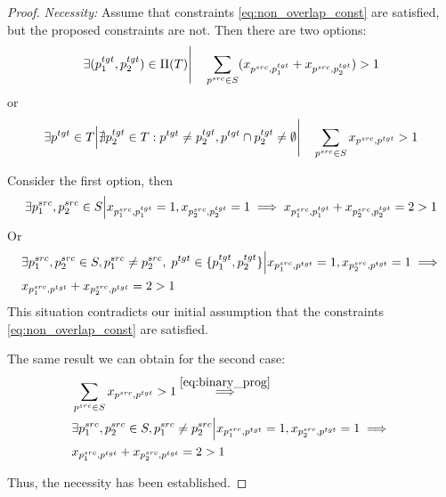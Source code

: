 \begin{proof}
  \textit{Necessity:} Assume that constraints \eqref{eq:non_overlap_const} are satisfied, but
  the proposed constraints are not. Then there are two options:
  \[
    \exists (p_1^{tgt}, p_2^{tgt}) \in \Pi(T) \Bigg| \quad
    \sum\limits_{p^{src} \in S} (x_{p^{src}, p_1^{tgt}} + x_{p^{src}, p_2^{tgt}}) > 1
  \]
  or
  \[
    \exists p^{tgt} \in T \Big|
    \nexists p_2^{tgt} \in T: p^{tgt} \neq p_2^{tgt}, p^{tgt} \cap p_2^{tgt} \neq \emptyset
    \Bigg| \quad \sum\limits_{p^{src} \in S} x_{p^{src}, p^{tgt}} > 1
  \]

  Consider the first option, then
  \begin{align*}
    \exists p_1^{src}, p_2^{src} \in S \Big| x_{p_1^{src}, p_1^{tgt}} = 1, x_{p_2^{src}, p_2^{tgt}} = 1 \implies
    x_{p_1^{src}, p_1^{tgt}} + x_{p_2^{src}, p_2^{tgt}} = 2 > 1 \\
  \end{align*}
  Or
  \begin{align*}
    & \exists p_1^{src}, p_2^{src} \in S, p_1^{src} \neq p_2^{src}, \; p^{tgt} \in \{p_1^{tgt}, p_2^{tgt}  \} \Big| x_{p_1^{src}, p^{tgt}} = 1, x_{p_2^{src}, p^{tgt}} = 1 \implies \\
    & x_{p_1^{src}, p^{tgt}} + x_{p_2^{src}, p^{tgt}} = 2 > 1
  \end{align*}
  This situation contradicts our initial assumption that the constraints \eqref{eq:non_overlap_const} are satisfied.

  The same result we can obtain for the second case:
  \begin{align*}
    & \sum\limits_{p^{src} \in S} x_{p^{src}, p^{tgt}} > 1
    \stackrel{\eqref{eq:binary_prog}}{\implies}                                                                                           \\
    & \exists p_1^{src}, p_2^{src} \in S, p_1^{src} \neq p_2^{src} \Big| x_{p_1^{src}, p^{tgt}} = 1, x_{p_2^{src}, p^{tgt}} = 1 \implies \\
    & x_{p_1^{src}, p^{tgt}} + x_{p_2^{src}, p^{tgt}} = 2 > 1
  \end{align*}

  Thus, the necessity has been established.


\end{proof}

